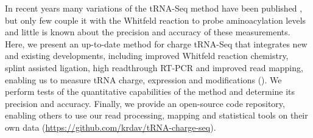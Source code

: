 \documentclass[9pt,lineno]{elife}
\begin{document}
In recent years many variations of the tRNA-Seq method have been published \citep{Wang2021-fc, Zheng2015-kj, Cozen2015-cx, Shigematsu2017-tv, Erber2020-qg, Thomas2021-fi, Lucas2023-vm, Pinkard2020-yd, Warren2021-wt, Yamagami2022-yb}, but only few couple it with the Whitfeld reaction to probe aminoacylation levels \citep{Evans2017-st, Behrens2021-gb, Watkins2022-er} and little is known about the precision and accuracy of these measurements.
Here, we present an up-to-date method for charge tRNA-Seq that integrates new and existing developments, including improved Whitfeld reaction chemistry, splint assisted ligation, high readthrough RT-PCR and improved read mapping, enabling us to measure tRNA charge, expression and modifications ().
We perform tests of the quantitative capabilities of the method and determine its precision and accuracy.
Finally, we provide an open-source code repository, enabling others to use our read processing, mapping and statistical tools on their own data (\url{https://github.com/krdav/tRNA-charge-seq}).
\end{document}
